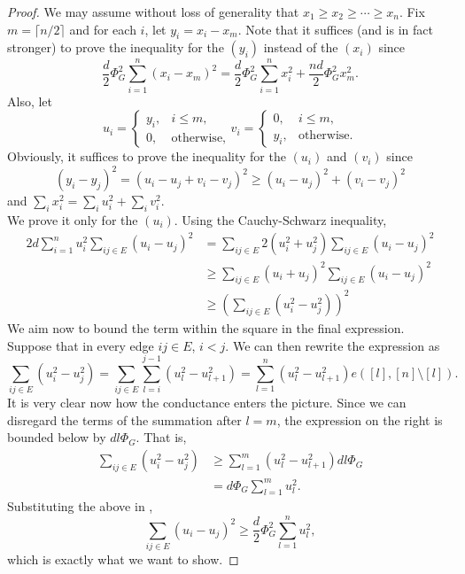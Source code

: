 \begin{proof}
We may assume without loss of generality that $x_1\geq x_2\geq \cdots\geq x_n$. Fix $m=\lceil n/2\rceil$ and for each $i$, let $y_i = x_i-x_m$. Note that it suffices (and is in fact stronger) to prove the inequality for the $(y_i)$ instead of the $(x_i)$ since
\[ \frac{d}{2}\Phi_G^2\sum_{i=1}^n (x_i-x_m)^2 = \frac{d}{2}\Phi_G^2\sum_{i=1}^n x_i^2 + \frac{nd}{2}\Phi_G^2 x_m^2. \]
Also, let
\[
u_i =
\begin{cases}
y_i, & i\leq m, \\
0, & \text{otherwise},
\end{cases}
v_i =
\begin{cases}
0, & i\leq m, \\
y_i, & \text{otherwise}.
\end{cases}
\]
Obviously, it suffices to prove the inequality for the $(u_i)$ and $(v_i)$ since \[(y_i-y_j)^2 = (u_i-u_j + v_i-v_j)^2\geq (u_i-u_j)^2 + (v_i-v_j)^2\]
and $\sum_i x_i^2 = \sum_i u_i^2 + \sum_i v_i^2$.\\
We prove it only for the $(u_i)$. Using the Cauchy-Schwarz inequality,
\begin{align}
	2d\sum_{i=1}^n u_i^2 \sum_{ij\in E} (u_i-u_j)^2 &= \sum_{ij\in E} 2(u_i^2 + u_j^2) \sum_{ij\in E}(u_i-u_j)^2 \nonumber \\
	&\geq \sum_{ij\in E} (u_i + u_j)^2 \sum_{ij\in E}(u_i-u_j)^2 \nonumber \\
	&\geq \left(\sum_{ij\in E} (u_i^2 - u_j^2)\right)^2 \label{eqn: random walk speed of convergence conductance lemma 2 cauchy schwarz}
\end{align}
We aim now to bound the term within the square in the final expression.\\
Suppose that in every edge $ij\in E$, $i<j$. We can then rewrite the expression as
\[ \sum_{ij\in E} (u_i^2-u_j^2) = \sum_{ij\in E} \sum_{l=i}^{j-1} (u_l^2-u_{l+1}^2) = \sum_{l=1}^{n} (u_l^2 - u_{l+1}^2) e\left([l],[n]\setminus[l]\right). \]
It is very clear now how the conductance enters the picture. Since we can disregard the terms of the summation after $l=m$, the expression on the right is bounded below by $dl\Phi_G$. That is,
\begin{align*}
	\sum_{ij\in E} (u_i^2-u_j^2) &\geq \sum_{l=1}^m (u_l^2-u_{l+1}^2) dl\Phi_G \\
	&= d\Phi_G\sum_{l=1}^m u_l^2.
\end{align*}
Substituting the above in ,
\[ \sum_{ij\in E}(u_i-u_j)^2 \geq \frac{d}{2}\Phi_G^2 \sum_{l=1}^n u_l^2, \]
which is exactly what we want to show.
\end{proof}

